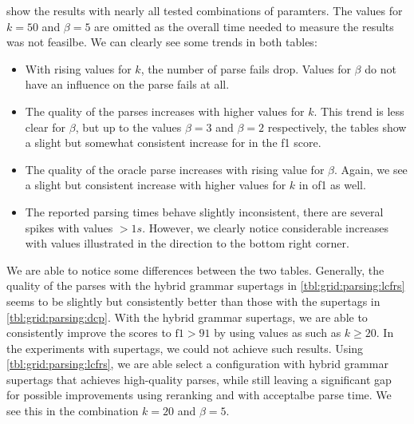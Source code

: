 \documentclass[../../document.tex]{subfiles}
\begin{document}
     show the results with nearly all tested combinations of paramters.
    The values for $k=50$ and $\beta = 5$ are omitted as the overall time needed to measure the results was not feasilbe.
    We can clearly see some trends in both tables:
    \begin{itemize}
        \item With rising values for $k$, the number of parse fails drop. Values for $\beta$ do not have an influence on the parse fails at all.
        \item The quality of the parses increases with higher values for $k$. This trend is less clear for $\beta$, but up to the values $\beta = 3$ and $\beta = 2$ respectively, the tables show a slight but somewhat consistent increase for in the f1 score.
        \item The quality of the oracle parse increases with rising value for $\beta$. Again, we see a slight but consistent increase with higher values for $k$ in of1 as well.
        \item The reported parsing times behave slightly inconsistent, there are several spikes with values $>1s$. However, we clearly notice considerable increases with values illustrated in the direction to the bottom right corner. 
    \end{itemize}

    We are able to notice some differences between the two tables.
    Generally, the quality of the parses with the hybrid grammar supertags in \cref{tbl:grid:parsing:lcfrs} seems to be slightly but consistently better than those with the  supertags in \cref{tbl:grid:parsing:dcp}.
    With the hybrid grammar supertags, we  are able to consistently improve the scores to $\mathrm{f1} > 91$ by using values as such as $k \ge 20$.
    In the experiments with  supertags, we could not achieve such results.
    Using \cref{tbl:grid:parsing:lcfrs}, we are able select a configuration with hybrid grammar supertags that achieves high-quality parses, while still leaving a significant gap for possible improvements using reranking and with acceptalbe parse time.
    We see this in the combination $k=20$ and $\beta=5$.
    
\end{document}
